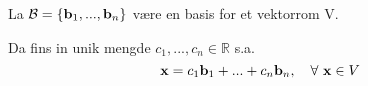 La $\mathcal{B} = \{ \mathbf{b}_1, ..., \mathbf{b}_n \}$
være en basis for et vektorrom V.

Da fins in unik mengde $c_1,...,c_n \in \mathbb{R}$ s.a.
$$\mathbf{x} = c_1\mathbf{b}_1 + ... + c_n\mathbf{b}_n,
  \quad \forall\ \mathbf{x} \in V$$
